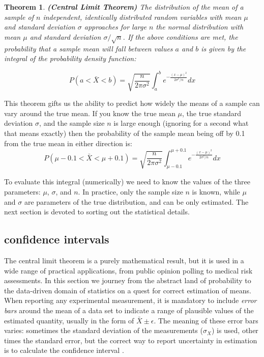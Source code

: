 \documentclass[
]{book}
\newtheorem{theorem}{Theorem}[chapter]
\theoremstyle{definition}
\theoremstyle{definition}
\theoremstyle{definition}
\theoremstyle{remark}
\begin{document}
\begin{theorem}
\protect\hypertarget{thm:CLT}{}{\label{thm:CLT} }\textbf{(Central Limit Theorem)} The distribution of the mean of a sample of \(n\) independent, identically distributed random variables with mean \(\mu\) and standard deviation \(\sigma\) approaches for large \(n\) the \emph{normal distribution} with mean \(\mu\) and standard deviation \(\sigma/\sqrt{n}\). If the above conditions are met, the probability that a sample mean will fall between values \(a\) and \(b\) is given by the integral of the probability density function:

\[ P(a < \bar X < b) = \sqrt{\frac{n}{2\pi \sigma^2}} \int_{a} ^b e^{-\frac{(x-\mu)^2}{2 \sigma^2/n}}dx\]
\end{theorem}

This theorem gifts us the ability to predict how widely the means of a sample can vary around the true mean. If you know the true mean \(\mu\), the true standard deviation \(\sigma\), and the sample size \(n\) is large enough (ignoring for a second what that means exactly) then the probability of the sample mean being off by 0.1 from the true mean in either direction is:
\[ P(\mu-0.1< \bar X < \mu+0.1) = \sqrt{\frac{n}{2\pi \sigma^2}} \int_{\mu-0.1} ^{\mu+0.1} e^{-\frac{(x-\mu)^2}{2 \sigma^2/n}}dx\]

To evaluate this integral (numerically) we need to know the values of the three parameters: \(\mu\), \(\sigma\), and \(n\). In practice, only the sample size \(n\) is known, while \(\mu\) and \(\sigma\) are parameters of the true distribution, and can be only estimated. The next section is devoted to sorting out the statistical details.

\hypertarget{confidence-intervals}{%
\subsection{confidence intervals}\label{confidence-intervals}}

The central limit theorem is a purely mathematical result, but it is used in a wide range of practical applications, from public opinion polling to medical risk assessments. In this section we journey from the abstract land of probability to the data-driven domain of statistics on a quest for correct estimation of means. When reporting any experimental measurement, it is mandatory to include \emph{error bars} around the mean of a data set to indicate a range of plausible values of the estimated quantity, usually in the form of \(\bar X \pm \epsilon\). The meaning of these error bars varies: sometimes the standard deviation of the measurements (\(\sigma_X\)) is used, other times the standard error, but the correct way to report uncertainty in estimation is to calculate the confidence interval \citep{whitlock_analysis_2008}.
\end{document}
